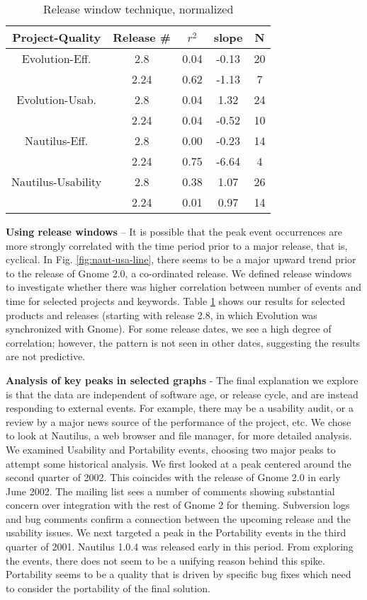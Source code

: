 \documentclass[conference, compsoc]{IEEEtran}
\begin{document}
\begin{table}
	\caption{Release window technique, normalized}
	\centering
	\label{tbl:windows}
\begin{tabular}{|c|c|c|c|c|}
\hline
\rowcolor[gray]{.9} 
Project-Quality & Release \# & $r^2$ & slope & N\\ \hline
Evolution-Eff. & 2.8 & 0.04 & -0.13 & 20 \\
 & 2.24 & 0.62 & -1.13 & 7\\ \hline
Evolution-Usab. & 2.8 & 0.04 & 1.32 & 24\\
 & 2.24 & 0.04 & -0.52 & 10 \\ \hline
Nautilus-Eff. & 2.8 & 0.00 & -0.23 & 14 \\
 & 2.24 & 0.75 & -6.64 & 4 \\ \hline
Nautilus-Usability & 2.8 & 0.38 & 1.07 & 26\\
 & 2.24 & 0.01 & 0.97 & 14\\
\hline
\end{tabular}
\end{table}

\noindent\textbf{Using release windows} -- It is possible that the peak event occurrences are more strongly correlated with the time period prior to a major release, that is, cyclical. In Fig. \ref{fig:naut-usa-line}, there seems to be a major upward trend prior to the release of Gnome 2.0, a co-ordinated release. We defined release windows to investigate whether there was higher correlation between number of events and time for selected projects and keywords. Table \ref{tbl:windows} shows our results for selected products and releases (starting with release 2.8, in which Evolution was synchronized with Gnome). For some release dates, we see a high degree of correlation; however, the pattern is not seen in other dates, suggesting the results are not predictive. 

\noindent\textbf{Analysis of key peaks in selected graphs} - The final explanation we explore is that the data are independent of software age, or release cycle, and are instead responding to external events. For example, there may be a usability audit, or a review by a major news source of the performance of the project, etc. We chose to look at Nautilus, a web browser and file manager, for more detailed analysis. We examined Usability and Portability events, choosing two major peaks to attempt some historical analysis. We first looked at a peak centered around the second quarter of 2002. This coincides with the release of Gnome 2.0 in early June 2002. The mailing list sees a number of comments showing substantial concern over integration with the rest of Gnome 2 for theming. Subversion logs and bug comments confirm a connection between the upcoming release and the usability issues. We next targeted a peak in the Portability events in the third quarter of 2001. Nautilus 1.0.4 was released early in this period. From exploring the events, there does not seem to be a unifying reason behind this spike. Portability seems to be a quality that is driven by specific bug fixes which need to consider the portability of the final solution.
\end{document}
